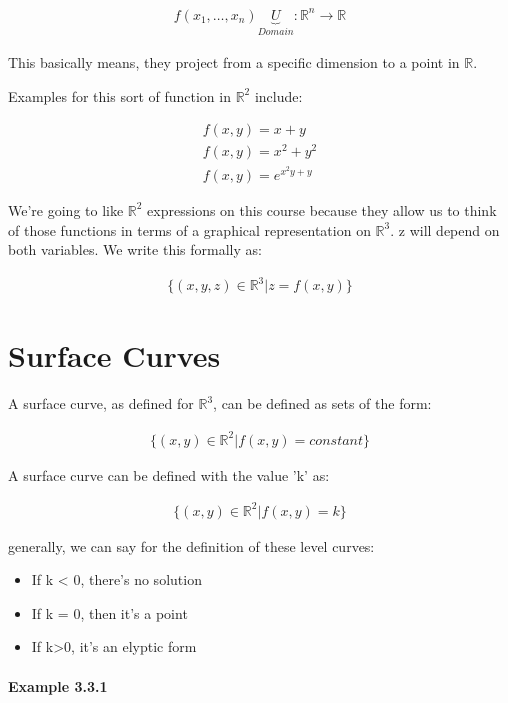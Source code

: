 \documentclass[11pt,fleqn]{book} %
\begin{document}
\begin{gather}
    f(x_1, \dots, x_n) \underbrace{U}_{Domain} : \mathbb{R}^n \to \mathbb{R}
\end{gather}

This basically means, they project from a specific dimension to a point in $\mathbb{R}$.

Examples for this sort of function in $\mathbb{R}^2$ include:

\begin{gather}
    f(x,y) = x+y \\
    f(x,y) = x^2 + y^2 \\
    f(x,y) = e^{x^2y + y}
\end{gather}

We're going to like $\mathbb{R}^2 $ expressions on this course because they allow us to think of those functions in terms of a graphical representation on $\mathbb{R}^3$.
z will depend on both variables. We write this formally as:

\begin{gather}
    \{ (x,y,z) \in \mathbb{R}^3 | z = f(x,y) \}
\end{gather}


\section{Surface Curves}

A surface curve, as defined for $\mathbb{R}^3$, can be defined as sets of the form:

\begin{gather}
    \{ (x,y) \in \mathbb{R}^2 | f(x,y) = constant \}
\end{gather}

A surface curve can be defined with the value 'k' as:

\begin{gather}
    \{ (x,y) \in \mathbb{R}^2 | f(x,y) = k \}
\end{gather}

generally, we can say for the definition of these level curves:

\begin{itemize}
    \item If k < 0, there's no solution
    \item If k = 0, then it's a point
    \item If k>0, it's an elyptic form
\end{itemize}


\paragraph{Example 3.3.1}
\end{document}
